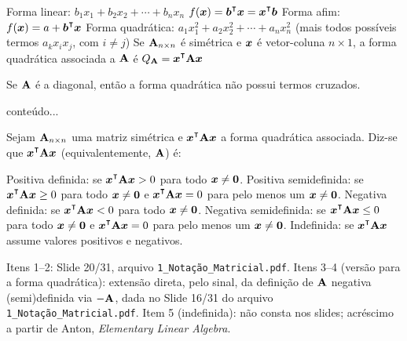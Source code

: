 \begin{definition}
	\leavevmode
	\begin{outline}[enumerate]
		\1 Forma linear: $b_1 x_1 + b_2 x_2 + \cdots + b_nx_n$
			\2 $f(\v{x}) = \v{b}\T\v{x} = \v{x}\T\v{b}$
		\1 Forma afim: $f(\v{x}) = a + \v{b}\T\v{x}$
		\1 Forma quadrática: $a_1 x_1^2 + a_2 x_2^2 + \cdots + a_nx_n^2$ (mais todos possíveis termos $a_kx_ix_j$, com $i\neq j$)
			\2 Se $\mathbf{A}_{n\times n}$ é simétrica e $\bm{x}$ é vetor-coluna $n\times 1$, a forma quadrática associada a $\mathbf{A}$ é $Q_\m{A} = \v{x}\T\m{A}\v{x}$
	\end{outline}
	\begin{note}
		\leavevmode
		\begin{outline}[enumerate]
			\1 Se $\mathbf{A}$ é a diagonal, então a forma quadrática não possui termos cruzados.
		\end{outline}
		conteúdo...
	\end{note}
\end{definition}



\begin{definition}
	Sejam $\mathbf{A}_{n\times n}$ uma matriz simétrica e $\v{x}\T\m{A}\v{x}$ a forma quadrática associada. Diz-se que $\v{x}\T\m{A}\v{x}$ (equivalentemente, $\mathbf{A}$) é:
	\begin{outline}[enumerate]
		\1 Positiva definida: se $\v{x}\T\m{A}\v{x} > 0$ para todo $\bm{x} \neq \bm{0}$.
		\1 Positiva semidefinida: se $\v{x}\T\m{A}\v{x} \geq 0$ para todo $\bm{x} \neq \bm{0}$ e $\v{x}\T\m{A}\v{x} = 0$ para pelo menos um $\bm{x} \neq \bm{0}$.
		\1 Negativa definida: se $\v{x}\T\m{A}\v{x} < 0$ para todo $\bm{x} \neq \bm{0}$.
		\1 Negativa semidefinida: se $\v{x}\T\m{A}\v{x} \leq 0$ para todo $\bm{x} \neq \bm{0}$ e $\v{x}\T\m{A}\v{x} = 0$ para pelo menos um $\bm{x} \neq \bm{0}$.
		\1 Indefinida: se $\v{x}\T\m{A}\v{x}$ assume valores positivos e negativos.
	\end{outline}
\end{definition}

\begin{note}
	\leavevmode
	\begin{outline}[enumerate]
		\1 Itens 1--2: Slide 20/31, arquivo \texttt{1\_Notação\_Matricial.pdf}.
		\1 Itens 3--4 (versão para a forma quadrática): extensão direta, pelo sinal, da definição de $\mathbf{A}$ negativa (semi)definida via $-\mathbf{A}$, dada no Slide 16/31 do arquivo \texttt{1\_Notação\_Matricial.pdf}.
		\1 Item 5 (indefinida): não consta nos slides; acréscimo a partir de Anton, \textit{Elementary Linear Algebra}.
	\end{outline}
\end{note}

